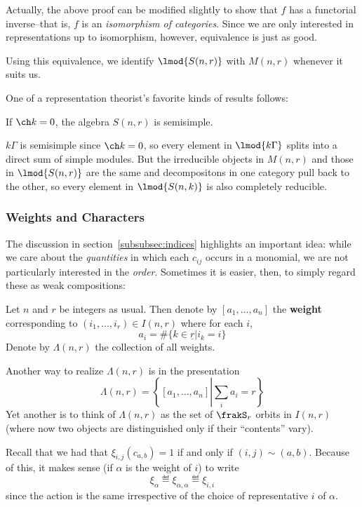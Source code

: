 \documentclass[12pt]{article}
\begin{document}
\begin{rmk}
	Actually, the above proof can be modified slightly to show that $f$ has a functorial inverse--that is, $f$ is an \textit{isomorphism of categories}.
	Since we are only interested in representations up to isomorphism, however, equivalence is just as good.
\end{rmk}
\begin{rmk}
	Using this equivalence, we identify $\lmod{S(n,r)}$ with $M(n,r)$ whenever it suits us.
\end{rmk}

One of a representation theorist's favorite kinds of results follows:
\begin{cor}
	If $\ch k=0$, the algebra $S(n,r)$ is semisimple.
\end{cor}
\begin{prf}
	$k\Gamma$ is semisimple since $\ch k=0$, so every element in $\lmod{k\Gamma}$ splits into a direct sum of simple modules. But the irreducible objects in 
	$M(n,r)$ and those in $\lmod{S(n,r)}$ are the same and decompositons in one category pull back to the other, so every element in $\lmod{S(n,k)}$ is also completely reducible.
\end{prf}

\subsubsection{Weights and Characters}
The discussion in section~\ref{subsubsec:indices} highlights an important idea: while we care about the \textit{quantities} in which each $c_{ij}$ occurs 
in a monomial, we are not particularly interested in the \textit{order}. Sometimes it is easier, then, to simply regard these as weak compositions:
\begin{defn}
	Let $n$ and $r$ be integers as usual. Then denote by $[a_1,\dots,a_n]$ the \textbf{weight} corresponding to 
	$(i_1,\dots,i_r)\in I(n,r)$ where for each $i$,
	\[a_i=\#\{k\in\underline r| i_k=i\}\]
	Denote by $\Lambda(n,r)$ the collection of all weights. 
\end{defn}
\begin{rmk}
	Another way to realize $\Lambda(n,r)$ is in the presentation 
	\[\Lambda(n,r)=\left\{[a_1,\dots,a_n]\left|\sum_i a_i=r\right.\right\}\]
	Yet another is to think of $\Lambda(n,r)$ as the set of $\frakS_r$ orbits in $I(n,r)$ (where now two objects 
	are distinguished only if their ``contents'' vary).
\end{rmk}
Recall that we had that $\xi_{i,j}(c_{a,b})=1$ if and only if $(i,j)\sim(a,b)$. Because of this, it makes sense (if $\alpha$ is the 
weight of $i$) to write 
\[\xi_{\alpha}\eqdef \xi_{\alpha,\alpha}\eqdef \xi_{i,i}\]
since the action is the same irrespective of the choice of representative $i$ of $\alpha.$
\end{document}
